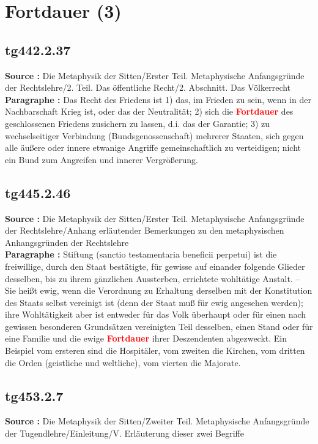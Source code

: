 \documentclass[a4paper,12pt,twoside]{book}
\newcommand{\match}[1]{\textcolor{red}{\textbf{#1}}}
\newcommand{\unnumberedsection}[1]{
	\section*{#1}
	\addcontentsline{toc}{section}{#1}
	\markright{#1}
}
\begin{document}
	\unnumberedsection{Fortdauer (3)} 
	\subsection*{tg442.2.37} 
	\textbf{Source : }Die Metaphysik der Sitten/Erster Teil. Metaphysische Anfangsgründe der Rechtslehre/2. Teil. Das öffentliche Recht/2. Abschnitt. Das Völkerrecht\\  
	
	\textbf{Paragraphe : }Das Recht des Friedens ist 1) das, im Frieden zu sein, wenn in der Nachbarschaft Krieg ist, oder das der Neutralität; 2) sich die \match{Fortdauer} des geschlossenen Friedens zusichern zu lassen, d.i. das der Garantie; 3) zu wechselseitiger Verbindung (Bundsgenossenschaft) mehrerer Staaten, sich gegen alle äußere oder innere etwanige Angriffe gemeinschaftlich zu verteidigen; nicht ein Bund zum Angreifen und innerer Vergrößerung. 
	
	\subsection*{tg445.2.46} 
	\textbf{Source : }Die Metaphysik der Sitten/Erster Teil. Metaphysische Anfangsgründe der Rechtslehre/Anhang erläutender Bemerkungen zu den metaphysischen Anhangsgründen der Rechtslehre\\  
	
	\textbf{Paragraphe : }
	Stiftung (sanctio testamentaria beneficii perpetui) ist die freiwillige, durch den Staat bestätigte, für gewisse auf einander folgende Glieder desselben, bis zu ihrem gänzlichen Aussterben, errichtete wohltätige Anstalt. – Sie heißt ewig, wenn die Verordnung zu Erhaltung derselben mit der Konstitution des Staats selbst vereinigt ist (denn der Staat muß für ewig angesehen werden); ihre Wohltätigkeit aber ist entweder für das Volk überhaupt oder für einen nach gewissen besonderen Grundsätzen vereinigten Teil desselben, einen Stand oder für eine Familie und die ewige \match{Fortdauer} ihrer Deszendenten abgezweckt. Ein Beispiel vom ersteren sind die Hospitäler, vom zweiten die Kirchen, vom dritten die Orden (geistliche und weltliche), vom vierten die Majorate. 
	
	\subsection*{tg453.2.7} 
	\textbf{Source : }Die Metaphysik der Sitten/Zweiter Teil. Metaphysische Anfangsgründe der Tugendlehre/Einleitung/V. Erläuterung dieser zwei Begriffe\\  
	
\end{document}
